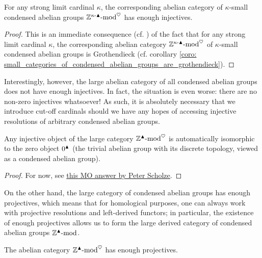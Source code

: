             \begin{proposition} \label{prop: small_categories_of_condensed_abelian_groups_have_enough_injectives}
                For any strong limit cardinal $\kappa$, the corresponding abelian category of $\kappa$-small condensed abelian groups $\mathbb{Z}^{\kappa\text{-}\blacktriangle}\text{-}\mathrm{mod}^{\heartsuit}$ has enough injectives. 
            \end{proposition}
                \begin{proof}
                    This is an immediate consequence (cf. \cite[Corollary 1.3.5.7]{HA}) of the fact that for any strong limit cardinal $\kappa$, the corresponding abelian category $\mathbb{Z}^{\kappa\text{-}\blacktriangle}\text{-}\mathrm{mod}^{\heartsuit}$ of $\kappa$-small condensed abelian groups is Grothendieck (cf. corollary \ref{coro: small_categories_of_condensed_abelian_groups_are_grothendieck}).
                \end{proof}
            Interestingly, however, the large abelian category of all condensed abelian groups does not have enough injectives. In fact, the situation is even worse: there are no non-zero injectives whatsoever! As such, it is absolutely necessary that we introduce cut-off cardinals should we have any hopes of accessing injective resolutions of arbitrary condensed abelian groups.
            \begin{proposition} \label{prop: injective_large_condensed_abelian_groups_are_trivial}
                Any injective object of the large category $\mathbb{Z}^{\blacktriangle}\text{-}\mathrm{mod}^{\heartsuit}$ is automatically isomorphic to the zero object $0^{\blacktriangle}$ (the trivial abelian group with its discrete topology, viewed as a condensed abelian group).
            \end{proposition}
                \begin{proof}
                    For now, see \href{https://mathoverflow.net/a/356261/143390}{\underline{this MO answer by Peter Scholze}}.
                \end{proof}
            On the other hand, the large category of condensed abelian groups has enough projectives, which means that for homological purposes, one can always work with projective resolutions and left-derived functors; in particular, the existence of enough projectives allows us to form the large derived category of condensed abelian groups $\mathbb{Z}^{\blacktriangle}\text{-}\mathrm{mod}$. 
            \begin{theorem} \label{theorem: the_large_category_of_condensed_abelian_groups_has_enough_projectives}
                The abelian category $\mathbb{Z}^{\blacktriangle}\text{-}\mathrm{mod}^{\heartsuit}$ has enough projectives.
            \end{theorem}
